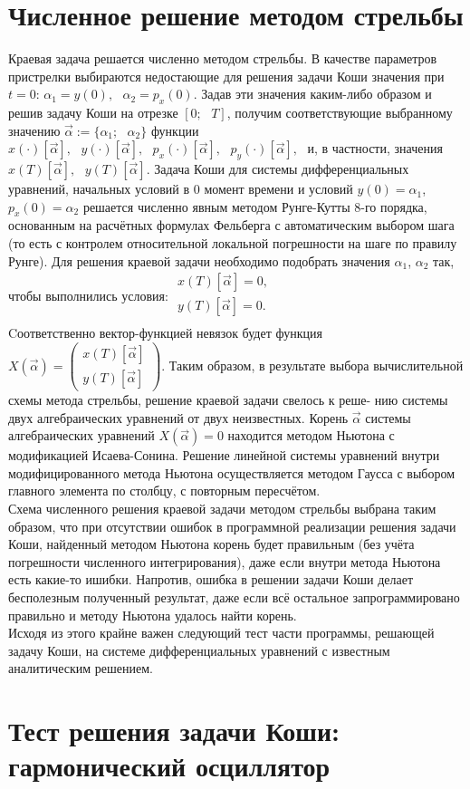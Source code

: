 \documentclass[a4paper,12pt,oneside]{article}
\numberwithin{equation}{section}
\numberwithin{table}{section}
\numberwithin{figure}{section}
\begin{document}
\section{Численное решение методом стрельбы}
Краевая задача решается численно методом стрельбы. В качестве параметров пристрелки выбираются недостающие для решения задачи Коши значения при $t=0$: $\alpha_1 = y(0),\text{ } \alpha_2 = p_x(0)$. Задав эти значения каким-либо образом и решив задачу Коши на отрезке  $\left[0;\text{ }T\right]$, получим соответствующие выбранному значению $\vec{\alpha}:=\{\alpha_1;\text{ }\alpha_2\}$ функции $x(\cdot)[\vec{\alpha}],\text{ }y(\cdot)[\vec{\alpha}],\text{ }p_x(\cdot)[\vec{\alpha}],\text{ }p_y(\cdot)[\vec{\alpha}],\text{ }$и, в частности, значения $x(T)[\vec{\alpha}],\text{ }y(T)[\vec{\alpha}]$. Задача Коши для системы дифференциальных
уравнений, начальных условий в 0 момент времени и условий $y(0) = \alpha_1$, $p_x (0) = \alpha_2$ решается
численно явным методом Рунге-Кутты 8-го порядка, основанным на расчётных формулах Фельберга с автоматическим выбором шага (то есть с контролем относительной локальной погрешности на шаге по правилу Рунге). Для решения краевой задачи необходимо подобрать значения $\alpha_1$, $\alpha_2$ так, чтобы выполнились условия:
$
\begin{array}{c}
    x(T)[\vec{\alpha}]=0,\\
    y(T)[\vec{\alpha}]=0.\\
\end{array}
$\\
Cоответственно вектор-функцией невязок будет функция $
X(\vec{\alpha})=
\left(
    \begin{array}{c}
        x(T)[\vec{\alpha}]\\
        y(T)[\vec{\alpha}]
    \end{array}
\right)
$. Таким образом, в результате выбора вычислительной схемы метода стрельбы, решение краевой задачи свелось к реше-
нию системы двух алгебраических уравнений от двух неизвестных. Корень $\vec{\alpha}$ системы алгебраических
уравнений $X(\vec{\alpha})=0$ находится методом Ньютона с модификацией Исаева-Сонина. Решение линейной системы уравнений внутри модифицированного метода Ньютона осуществляется методом Гаусса с выбором главного элемента по столбцу, с повторным пересчётом.\\

Схема численного решения краевой задачи методом стрельбы выбрана таким образом, что при отсутствии ошибок в программной реализации решения задачи Коши, найденный методом Ньютона корень будет правильным (без учёта погрешности численного интегрирования), даже если внутри метода Ньютона есть какие-то ишибки. Напротив, ошибка в решении задачи Коши делает бесполезным полученный результат, даже если всё остальное запрограммировано правильно и методу Ньютона
удалось найти корень.\\

Исходя из этого крайне важен следующий тест части программы, решающей задачу Коши, на
системе дифференциальных уравнений с известным аналитическим решением.

\section{Тест решения задачи Коши:\\ гармонический осциллятор}
\end{document}
